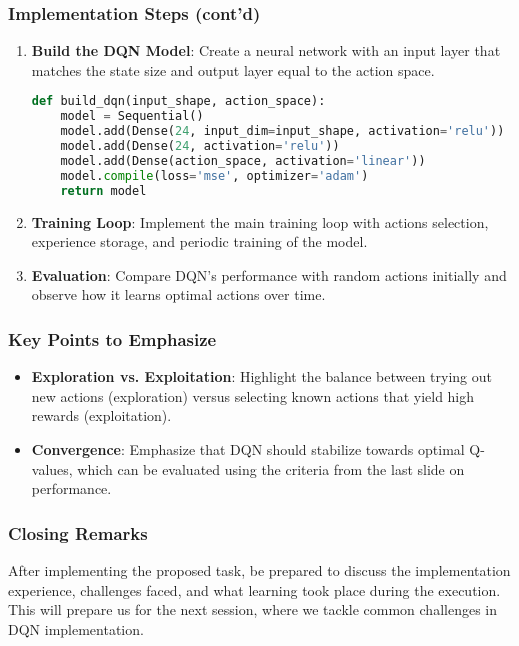 \documentclass{beamer}
\begin{document}
\begin{frame}[fragile]
    \frametitle{Implementation Steps (cont'd)}
    \begin{enumerate}[resume]
        \item \textbf{Build the DQN Model}: Create a neural network with an input layer that matches the state size and output layer equal to the action space.
        
        \begin{lstlisting}[language=Python]
def build_dqn(input_shape, action_space):
    model = Sequential()
    model.add(Dense(24, input_dim=input_shape, activation='relu'))
    model.add(Dense(24, activation='relu'))
    model.add(Dense(action_space, activation='linear'))
    model.compile(loss='mse', optimizer='adam')
    return model
        \end{lstlisting}

        \item \textbf{Training Loop}: Implement the main training loop with actions selection, experience storage, and periodic training of the model.
        
        \item \textbf{Evaluation}: Compare DQN's performance with random actions initially and observe how it learns optimal actions over time.
    \end{enumerate}
\end{frame}

\begin{frame}
    \frametitle{Key Points to Emphasize}
    \begin{itemize}
        \item \textbf{Exploration vs. Exploitation}: Highlight the balance between trying out new actions (exploration) versus selecting known actions that yield high rewards (exploitation).
        \item \textbf{Convergence}: Emphasize that DQN should stabilize towards optimal Q-values, which can be evaluated using the criteria from the last slide on performance.
    \end{itemize}
\end{frame}

\begin{frame}
    \frametitle{Closing Remarks}
    After implementing the proposed task, be prepared to discuss the implementation experience, challenges faced, and what learning took place during the execution. This will prepare us for the next session, where we tackle common challenges in DQN implementation.
\end{frame}
\end{document}
